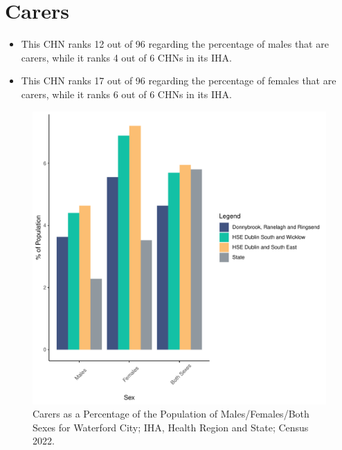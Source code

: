 \documentclass{article}
\begin{document}
\section{Carers}\label{sect:Carers}
\begin{itemize}
\item This CHN ranks  12 out of 96 regarding the percentage of males that are carers, while it ranks   4 out of 6 CHNs in its IHA.
\item This CHN ranks  17 out of 96 regarding the percentage of females that are carers, while it ranks   6 out of 6 CHNs in its IHA.
\end{itemize}
\begin{figure}[H]
	\centering
	\includegraphics[width = 150mm]{../figures/CareED.pdf}
	\caption{Carers as a Percentage of the Population of Males/Females/Both Sexes for Waterford City; IHA, Health Region and State; Census 2022.}
	\label{fig:2ae19629-1a6a-13a3-e055-000000000001}
	\end{figure}
\end{document}
